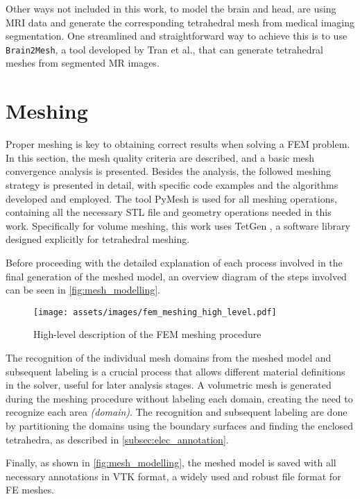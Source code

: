 Other ways not included in this work, to model the brain and head, are using \gls{MRI} data and generate the corresponding tetrahedral mesh from medical imaging segmentation. One streamlined and straightforward way to achieve this is to use \texttt{Brain2Mesh}, a tool developed by Tran et al.\cite{Tran2020}, that can generate tetrahedral meshes from segmented \gls{MR} images.

\section{Meshing}
\label{sec:fem_meshing}

Proper meshing is key to obtaining correct results when solving a \gls{FEM} problem. In this section, the mesh quality criteria are described, and a basic mesh convergence analysis is presented. Besides the analysis, the followed meshing strategy is presented in detail, with specific code examples and the algorithms developed and employed. The tool PyMesh \cite{pymesh} is used for all meshing operations, containing all the necessary \gls{STL} file and geometry operations needed in this work. Specifically for volume meshing, this work uses TetGen \cite{tetgen}, a software library designed explicitly for tetrahedral meshing.

Before proceeding with the detailed explanation of each process involved in the final generation of the meshed model, an overview diagram of the steps involved can be seen in \autoref{fig:mesh_modelling}.

\begin{figure}[H]
    \centering
    \texttt{[image: assets/images/fem\_meshing\_high\_level.pdf]}
    \caption{High-level description of the \gls{FEM} meshing procedure}
    \label{fig:mesh_modelling}
\end{figure}

\noindent The recognition of the individual mesh domains from the meshed model and subsequent labeling is a crucial process that allows different material definitions in the solver, useful for later analysis stages. A volumetric mesh is generated during the meshing procedure without labeling each domain, creating the need to recognize each area \textit{(domain)}. The recognition and subsequent labeling are done by partitioning the domains using the boundary surfaces and finding the enclosed tetrahedra, as described in \ref{subsec:elec_annotation}.

Finally, as shown in \autoref{fig:mesh_modelling}, the meshed model is saved with all necessary annotations in \gls{VTK} format, a widely used and robust file format for \gls{FE} meshes.

